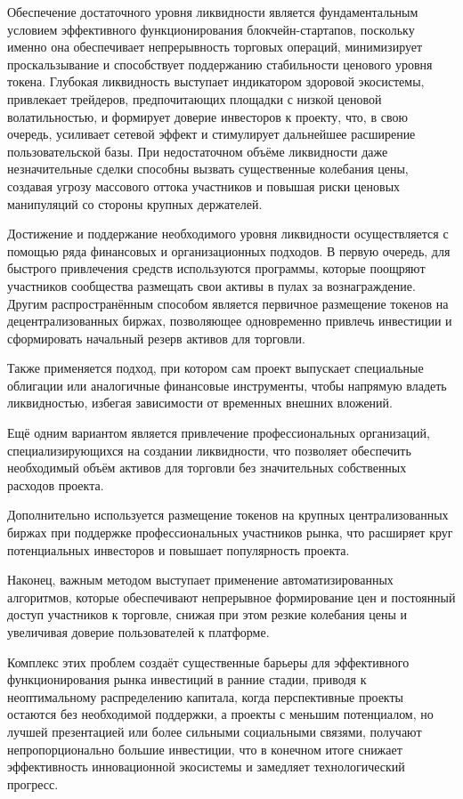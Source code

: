 \documentclass[
    14pt,
    specialist,
    candidate, %
    subf, %
    href,
    dotsinheaders=false
]{disser}
\begin{document}
Обеспечение достаточного уровня ликвидности является фундаментальным условием эффективного функционирования блокчейн-стартапов, поскольку именно она обеспечивает непрерывность торговых операций, минимизирует проскальзывание и способствует поддержанию стабильности ценового уровня токена. Глубокая ликвидность выступает индикатором здоровой экосистемы, привлекает трейдеров, предпочитающих площадки с низкой ценовой волатильностью, и формирует доверие инвесторов к проекту, что, в свою очередь, усиливает сетевой эффект и стимулирует дальнейшее расширение пользовательской базы. При недостаточном объёме ликвидности даже незначительные сделки способны вызвать существенные колебания цены, создавая угрозу массового оттока участников и повышая риски ценовых манипуляций со стороны крупных держателей.

Достижение и поддержание необходимого уровня ликвидности осуществляется с помощью ряда финансовых и организационных подходов. В первую очередь, для быстрого привлечения средств используются программы, которые поощряют участников сообщества размещать свои активы в пулах за вознаграждение. Другим распространённым способом является первичное размещение токенов на децентрализованных биржах, позволяющее одновременно привлечь инвестиции и сформировать начальный резерв активов для торговли.

Также применяется подход, при котором сам проект выпускает специальные облигации или аналогичные финансовые инструменты, чтобы напрямую владеть ликвидностью, избегая зависимости от временных внешних вложений.

Ещё одним вариантом является привлечение профессиональных организаций, специализирующихся на создании ликвидности, что позволяет обеспечить необходимый объём активов для торговли без значительных собственных расходов проекта.

Дополнительно используется размещение токенов на крупных централизованных биржах при поддержке профессиональных участников рынка, что расширяет круг потенциальных инвесторов и повышает популярность проекта.

Наконец, важным методом выступает применение автоматизированных алгоритмов, которые обеспечивают непрерывное формирование цен и постоянный доступ участников к торговле, снижая при этом резкие колебания цены и увеличивая доверие пользователей к платформе.

Комплекс этих проблем создаёт существенные барьеры для эффективного функционирования рынка инвестиций в ранние стадии, приводя к неоптимальному распределению капитала, когда перспективные проекты остаются без необходимой поддержки, а проекты с меньшим потенциалом, но лучшей презентацией или более сильными социальными связями, получают непропорционально большие инвестиции, что в конечном итоге снижает эффективность инновационной экосистемы и замедляет технологический прогресс.
\end{document}

